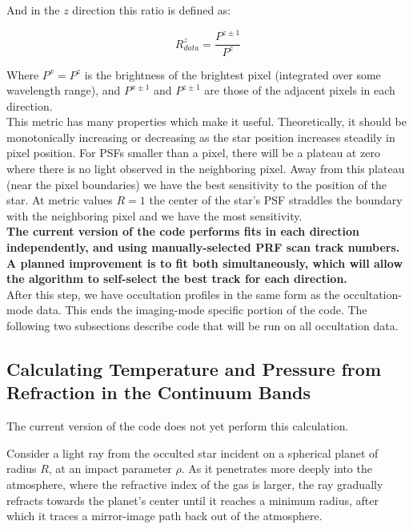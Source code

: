 \documentclass[12pt]{article}
\begin{document}
And in the $z$ direction this ratio is defined as:

\begin{equation}
R_{data}^z = \frac{P^{z\pm1}}{P^{z}}
\end{equation}

Where $P^x = P^z$ is the brightness of the brightest pixel (integrated over
some wavelength range), and $P^{x\pm1}$ and $P^{z\pm1}$ are those of the
adjacent pixels in each direction.\\

This metric has many properties which make it useful. Theoretically, it should
be monotonically increasing or decreasing as the star position increases
steadily in pixel position.  For PSFs smaller than a pixel, there will be a
plateau at zero where there is no light observed in the neighboring pixel. Away
from this plateau (near the pixel boundaries) we have the best sensitivity to
the position of the star. At metric values $R = 1$ the center of the star's PSF
straddles the boundary with the neighboring pixel and we have the most
sensitivity.\\

{\bf The current version of the code performs fits in each direction independently,
and using manually-selected PRF scan track numbers. A planned improvement is to
fit both simultaneously, which will allow the algorithm to self-select the best
track for each direction.} \\

After this step, we have occultation profiles in the same form as the
occultation-mode data. This ends the imaging-mode specific portion of the code.
The following two subsections describe code that will be run on all occultation
data.

\subsection{Calculating Temperature and Pressure from Refraction in the Continuum Bands}

The current version of the code does not yet perform this calculation.

Consider a light ray from the occulted star incident on a spherical planet of
radius $R$, at an impact parameter $\rho$. As it penetrates more deeply into
the atmosphere, where the refractive index of the gas is larger, the ray
gradually refracts towards the planet's center until it reaches a minimum
radius, after which it traces a mirror-image path back out of the atmosphere.
\end{document}
